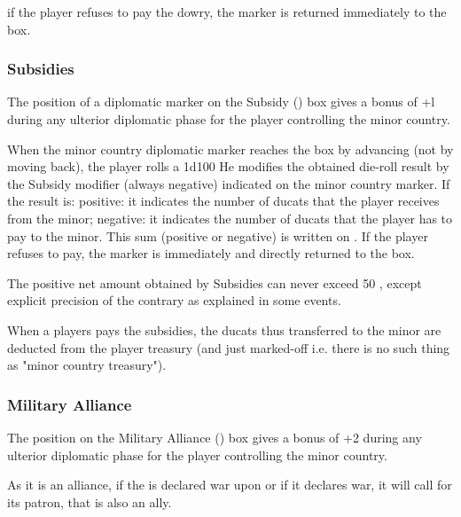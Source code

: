 \aparag if the player refuses to pay the dowry, the marker is returned
immediately to the \Neutral box.


\subsubsection{Subsidies}
\aparag The position of a diplomatic marker on the Subsidy (\SUB) box gives a
bonus of +l during any ulterior diplomatic phase for the player controlling
the minor country.

When the minor country diplomatic marker reaches the \SUB box by advancing
(not by moving back), the player rolls a 1d100 He modifies the obtained
die-roll result by the Subsidy modifier (always negative) indicated on the
minor country marker.  If the result is:
\bparag positive: it indicates the number of ducats that the player receives
from the minor;
\bparag negative: it indicates the number of ducats that the player has to pay
to the minor.
\aparag This sum (positive or negative) is written on .
\aparag If the player refuses to pay, the marker is immediately and directly
returned to the \Neutral box.

\aparag The positive net amount obtained by Subsidies can never exceed 50
\ducats, except explicit precision of the contrary as explained in some
events.

\aparag When a players pays the subsidies, the ducats thus transferred to the
minor are deducted from the player treasury (and just marked-off i.e. there is
no such thing as "minor country treasury").



\subsubsection{Military Alliance}
\aparag The position on the Military Alliance (\AM) box gives a bonus of +2
during any ulterior diplomatic phase for the player controlling the minor
country.

\aparag[Alliance.] As it is an alliance, if the \MIN is declared war upon or
if it declares war, it will call for its patron, that is also an ally.

